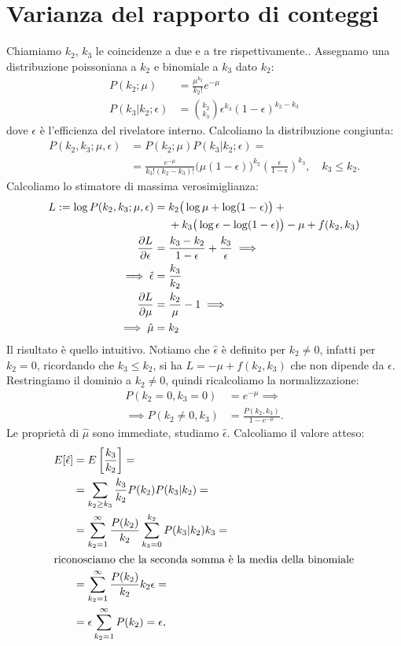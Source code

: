 \appendix
\section{Varianza del rapporto di conteggi}

Chiamiamo $k_2$, $k_3$ le coincidenze a due e a tre rispettivamente..
Assegnamo una distribuzione poissoniana a $k_2$ e binomiale a $k_3$ dato $k_2$:
\begin{align*}
	P(k_2;\mu)
	&= \frac{\mu^{k_2}}{k_2!}e^{-\mu} \\
	P(k_3|k_2;\epsilon)
	&= \binom{k_2}{k_3} \epsilon^{k_3} (1-\epsilon)^{k_2-k_3}
\end{align*}
dove $\epsilon$ è l'efficienza del rivelatore interno.
Calcoliamo la distribuzione congiunta:
\begin{align*}
	P(k_2,k_3;\mu,\epsilon)
	&= P(k_2;\mu) P(k_3|k_2;\epsilon) = \\
	&= \frac{e^{-\mu}}{k_3!(k_2-k_3)!} \big(\mu(1-\epsilon)\big)^{k_2} \left(\frac\epsilon{1-\epsilon}\right)^{k_3},
	\quad k_3 \le k_2.
\end{align*}
Calcoliamo lo stimatore di massima verosimiglianza:
\begin{align*}
	L := \log P(k_2,k_3;\mu,\epsilon)
	&= k_2 \big( \log\mu + \log(1-\epsilon) \big) + {}\\
	&\phantom{{}={}}+ k_3 \big( \log\epsilon - \log(1-\epsilon) \big)
	- \mu + f(k_2,k_3) \\
	\pdv{L}{\epsilon}
	&= \frac{k_3-k_2}{1-\epsilon} + \frac{k_3}\epsilon \implies \\
	\implies \hat\epsilon
	&= \frac{k_3}{k_2} \\
	\pdv{L}{\mu}
	&= \frac{k_2}{\mu} - 1 \implies \\
	\implies \hat\mu
	&= k_2
\end{align*}
Il risultato è quello intuitivo.
Notiamo che $\hat\epsilon$ è definito per $k_2\neq 0$,
infatti per $k_2=0$, ricordando che $k_3\le k_2$, si ha
$L = -\mu + f(k_2,k_3)$ che non dipende da $\epsilon$.
Restringiamo il dominio a $k_2\neq 0$,
quindi ricalcoliamo la normalizzazione:
\begin{align*}
	P(k_2=0,k_3=0)
	&= e^{-\mu} \implies \\
	\implies P(k_2\neq 0,k_3)
	&= \frac{P(k_2,k_3)}{1-e^{-\mu}}.
\end{align*}
Le proprietà di $\hat\mu$ sono immediate,
studiamo $\hat\epsilon$.
Calcoliamo il valore atteso:
\begin{align*}
	E[\hat\epsilon]
	&= E \left[ \frac{k_3}{k_2} \right] = \\
	&= \sum_{k_2\ge k_3} \frac{k_3}{k_2} P(k_2) P(k_3|k_2) = \\
	&= \sum_{k_2=1}^\infty \frac{P(k_2)}{k_2}
	\sum_{k_3=0}^{k_2} P(k_3|k_2) k_3 = \\
	\intertext{riconosciamo che la seconda somma è la media della binomiale}
	&= \sum_{k_2=1}^\infty \frac{P(k_2)}{k_2} k_2 \epsilon = \\
	&= \epsilon \sum_{k_2=1}^\infty P(k_2)
	= \epsilon,
\end{align*}
